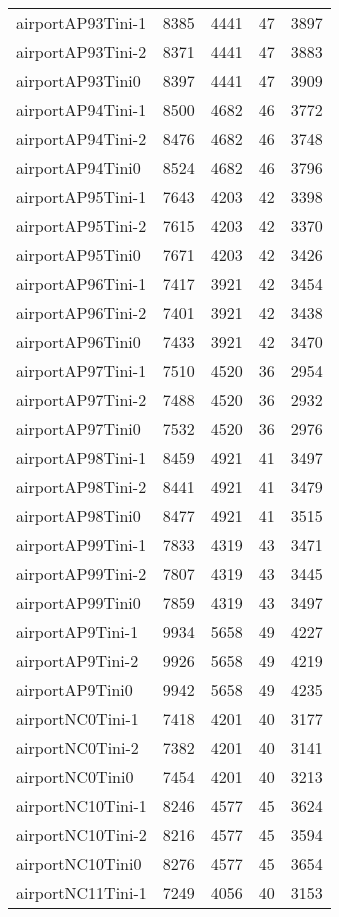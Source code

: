 \begin{longtable}{lrrrr}
airportAP93Tini-1 & 8385 & 4441 & 47 & 3897 \\
airportAP93Tini-2 & 8371 & 4441 & 47 & 3883 \\
airportAP93Tini0 & 8397 & 4441 & 47 & 3909 \\
airportAP94Tini-1 & 8500 & 4682 & 46 & 3772 \\
airportAP94Tini-2 & 8476 & 4682 & 46 & 3748 \\
airportAP94Tini0 & 8524 & 4682 & 46 & 3796 \\
airportAP95Tini-1 & 7643 & 4203 & 42 & 3398 \\
airportAP95Tini-2 & 7615 & 4203 & 42 & 3370 \\
airportAP95Tini0 & 7671 & 4203 & 42 & 3426 \\
airportAP96Tini-1 & 7417 & 3921 & 42 & 3454 \\
airportAP96Tini-2 & 7401 & 3921 & 42 & 3438 \\
airportAP96Tini0 & 7433 & 3921 & 42 & 3470 \\
airportAP97Tini-1 & 7510 & 4520 & 36 & 2954 \\
airportAP97Tini-2 & 7488 & 4520 & 36 & 2932 \\
airportAP97Tini0 & 7532 & 4520 & 36 & 2976 \\
airportAP98Tini-1 & 8459 & 4921 & 41 & 3497 \\
airportAP98Tini-2 & 8441 & 4921 & 41 & 3479 \\
airportAP98Tini0 & 8477 & 4921 & 41 & 3515 \\
airportAP99Tini-1 & 7833 & 4319 & 43 & 3471 \\
airportAP99Tini-2 & 7807 & 4319 & 43 & 3445 \\
airportAP99Tini0 & 7859 & 4319 & 43 & 3497 \\
airportAP9Tini-1 & 9934 & 5658 & 49 & 4227 \\
airportAP9Tini-2 & 9926 & 5658 & 49 & 4219 \\
airportAP9Tini0 & 9942 & 5658 & 49 & 4235 \\
airportNC0Tini-1 & 7418 & 4201 & 40 & 3177 \\
airportNC0Tini-2 & 7382 & 4201 & 40 & 3141 \\
airportNC0Tini0 & 7454 & 4201 & 40 & 3213 \\
airportNC10Tini-1 & 8246 & 4577 & 45 & 3624 \\
airportNC10Tini-2 & 8216 & 4577 & 45 & 3594 \\
airportNC10Tini0 & 8276 & 4577 & 45 & 3654 \\
airportNC11Tini-1 & 7249 & 4056 & 40 & 3153 \\

\end{longtable}
